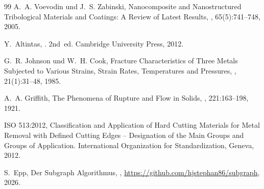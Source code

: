 ﻿\documentclass[a4paper,12pt]{article}
\theoremstyle{definition}
\begin{document}
\begin{thebibliography}{99}
A.~A. Voevodin und J.~S. Zabinski,
\newblock Nanocomposite and Nanostructured Tribological Materials and Coatings:
A Review of Latest Results,
, 65(5):741--748, 2005.

Y.~Altintas,
.
\newblock 2nd~ed. Cambridge University Press, 2012.

G.~R. Johnson und W.~H. Cook,
\newblock Fracture Characteristics of Three Metals Subjected to Various Strains,
Strain Rates, Temperatures and Pressures,
, 21(1):31--48, 1985.

A.~A. Griffith,
\newblock The Phenomena of Rupture and Flow in Solids,
,
221:163--198, 1921.

{ISO 513:2012},
\newblock Classification and Application of Hard Cutting Materials for Metal
Removal with Defined Cutting Edges -- Designation of the Main Groups and
Groups of Application.
\newblock International Organization for Standardization, Geneva, 2012.

S.~Epp,
\newblock Der Subgraph Algorithmus,
, \url{https://github.com/hjstephan86/subgraph},
2026.

\end{thebibliography}
\end{document}
